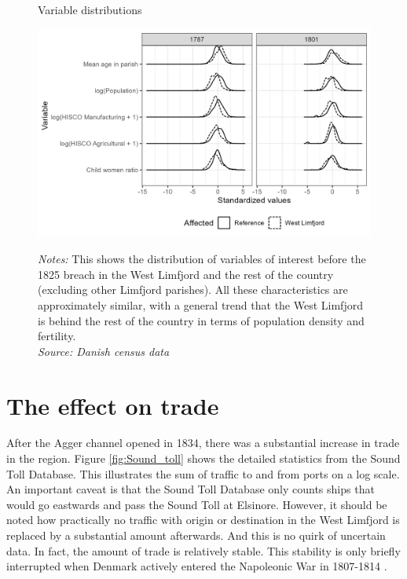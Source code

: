 \documentclass[11pt]{article}
\begin{document}
\begin{figure}
\begin{center}
  \caption{Variable distributions}
  \label{fig:bal}
  \includegraphics[width=1\textwidth]{Plots/Balancing_plot.png}
  \parbox{0.9\textwidth}{
  \caption*{\footnotesize \textit{Notes:} This shows the distribution of variables of interest before the 1825 breach in the West Limfjord and the rest of the country (excluding other Limfjord parishes). All these characteristics are approximately similar, with a general trend that the West Limfjord is behind the rest of the country in terms of population density and fertility. \\ \textit{Source: Danish census data}}
}
\end{center}
\end{figure}

\FloatBarrier
\section{The effect on trade}
After the Agger channel opened in 1834, there was a substantial increase in trade in the region. Figure \ref{fig:Sound_toll} shows the detailed statistics from the Sound Toll Database. This illustrates the sum of traffic to and from ports on a log scale. An important caveat is that the Sound Toll Database only counts ships that would go eastwards and pass the Sound Toll at Elsinore. However, it should be noted how practically no traffic with origin or destination in the West Limfjord is replaced by a substantial amount afterwards. And this is no quirk of uncertain data. In fact, the amount of trade is relatively stable. This stability is only briefly interrupted when Denmark actively entered the Napoleonic War in 1807-1814 \citep{Feldbaek2015}. 
\end{document}

